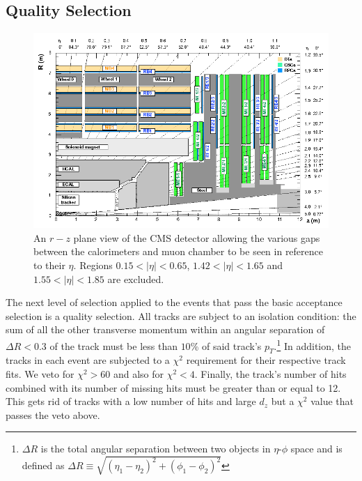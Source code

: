 \documentclass[a4paper,12pt]{article}
\begin{document}
    \subsection{Quality Selection}

        \begin{figure}[ht]
            \begin{center}
                \includegraphics[scale=0.5]{Figures/CMS_rz_Cutaway.png}
            \end{center}
            \caption{An $r-z$ plane view of the CMS detector\cite{Abbiendi} allowing the
            various gaps between the calorimeters and muon chamber to be seen in
            reference to their $\eta$. Regions $0.15 < |\eta| < 0.65$, $1.42 <
            |\eta| < 1.65$ and $1.55 < |\eta| < 1.85$ are excluded.}
            \label{fig:cms_rz}
        \end{figure}

        The next level of selection applied to the events that pass the basic
        acceptance selection is a quality selection. All tracks are subject to
        an isolation condition: the sum of all the other transverse momentum
        within an angular separation of $\Delta R < 0.3$ of the track must be
        less than $10$\% of said track's $p_{T}$.\footnote{$\Delta R$ is the
        total angular separation between two objects in $\eta$-$\phi$ space and
        is defined as $\Delta R \equiv \sqrt{(\eta_1 - \eta_2)^2 + (\phi_1 -
        \phi_2)^2}$} In addition, the tracks in each event are subjected to a
        $\chi^{2}$ requirement for their respective track fits. We veto for
        $\chi^{2} > 60$ and also for $\chi^{2} < 4$. Finally, the track's number
        of hits combined with its number of missing hits must be greater than or
        equal to 12. This gets rid of tracks with a low number of hits and large
        $d_z$ but a $\chi^2$ value that passes the veto above.
\end{document}
